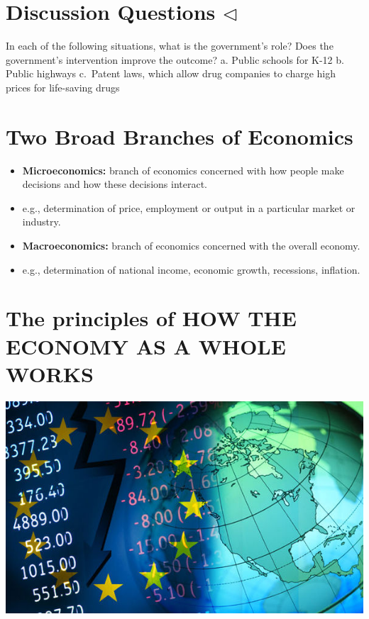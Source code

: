 \documentclass[
]{book}
\begin{document}
\hypertarget{discussion-questions-triangleleft}{%
\section{\texorpdfstring{Discussion Questions \(\triangleleft\)}{Discussion Questions \textbackslash triangleleft}}\label{discussion-questions-triangleleft}}

In each of the following situations, what is the government's role? Does the government's intervention improve the outcome?
a. Public schools for K-12
b. Public highways
c.~Patent laws, which allow drug companies to charge high prices for life-saving drugs

\hypertarget{two-broad-branches-of-economics}{%
\section{Two Broad Branches of Economics}\label{two-broad-branches-of-economics}}

\begin{itemize}
\item
  \textbf{Microeconomics:} branch of economics concerned with how people make decisions and how these decisions interact.
\item
  e.g., determination of price, employment or output in a particular market or industry.
\item
  \textbf{Macroeconomics:} branch of economics concerned with the overall economy.
\item
  e.g., determination of national income, economic growth, recessions, inflation.
\end{itemize}

\hypertarget{the-principles-of-how-the-economy-as-a-whole-works}{%
\section{The principles of HOW THE ECONOMY AS A WHOLE WORKS}\label{the-principles-of-how-the-economy-as-a-whole-works}}

\includegraphics[width=\textwidth,height=0.5\textheight]{images/lesson01/fig3.jpg}
\end{document}
